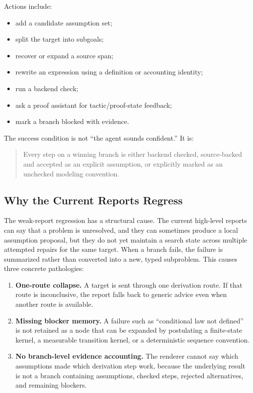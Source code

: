 \documentclass[11pt]{article}
\begin{document}
Actions include:

\begin{itemize}[leftmargin=*]
\item add a candidate assumption set;
\item split the target into subgoals;
\item recover or expand a source span;
\item rewrite an expression using a definition or accounting identity;
\item run a backend check;
\item ask a proof assistant for tactic/proof-state feedback;
\item mark a branch blocked with evidence.
\end{itemize}

The success condition is not ``the agent sounds confident.'' It is:

\begin{quote}
Every step on a winning branch is either backend checked, source-backed and
accepted as an explicit assumption, or explicitly marked as an unchecked
modeling convention.
\end{quote}

\subsection{Why the Current Reports Regress}

The weak-report regression has a structural cause. The current high-level
reports can say that a problem is unresolved, and they can sometimes produce a
local assumption proposal, but they do not yet maintain a search state across
multiple attempted repairs for the same target. When a branch fails, the
failure is summarized rather than converted into a new, typed subproblem. This
causes three concrete pathologies:

\begin{enumerate}[leftmargin=*]
\item \textbf{One-route collapse.} A target is sent through one derivation
  route. If that route is inconclusive, the report falls back to generic
  advice even when another route is available.
\item \textbf{Missing blocker memory.} A failure such as ``conditional law not
  defined'' is not retained as a node that can be expanded by postulating a
  finite-state kernel, a measurable transition kernel, or a deterministic
  sequence convention.
\item \textbf{No branch-level evidence accounting.} The renderer cannot say
  which assumptions made which derivation step work, because the underlying
  result is not a branch containing assumptions, checked steps, rejected
  alternatives, and remaining blockers.
\end{enumerate}
\end{document}

